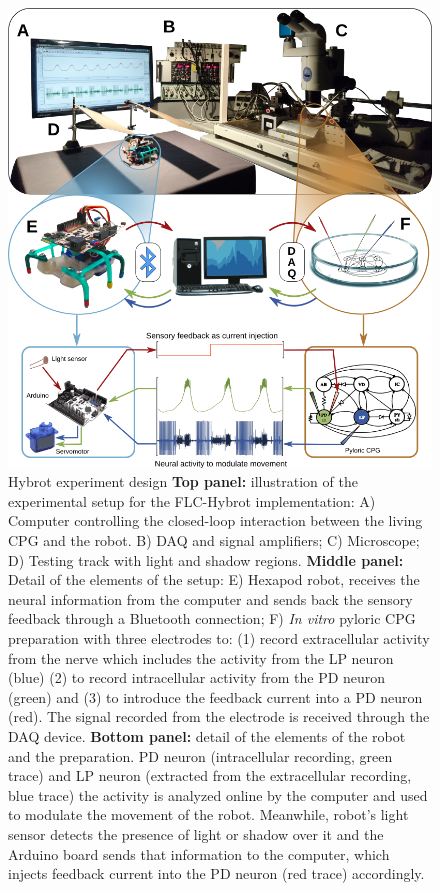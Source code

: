 \begin{figure}[h!]
	\begin{center}
		\includegraphics[width=0.65\linewidth]{img/invariants/robot/robot_results_setup.png}
	\end{center}
	\caption{Hybrot experiment design \textbf{Top panel:} illustration of the experimental setup for the FLC-Hybrot implementation: A) Computer controlling the closed-loop interaction between the living CPG and the robot. B) DAQ and signal amplifiers; C) Microscope; D) Testing track with light and shadow regions. \textbf{Middle panel:} Detail of the elements of the setup: E) Hexapod robot, receives the neural information from the computer and sends back the sensory feedback through a Bluetooth connection; F) \textit{In vitro} pyloric CPG preparation with three electrodes to: (1) record extracellular activity from the nerve which includes the activity from the LP neuron (blue) (2) to record intracellular activity from the PD neuron (green) and (3) to introduce the feedback current into a PD neuron (red). The signal recorded from the electrode is received through the DAQ device. \textbf{Bottom panel:} detail of the elements of the robot and the preparation. PD neuron (intracellular recording, green trace) and LP neuron (extracted from the extracellular recording, blue trace) the activity is analyzed online by the computer and used to modulate the movement of the robot. Meanwhile, robot's light sensor detects the presence of light or shadow over it and the Arduino board sends that information to the computer, which injects feedback current into the PD neuron (red trace) accordingly.}
	\label{fig:robot_results_setup}
\end{figure}



\newpage
\clearpage



